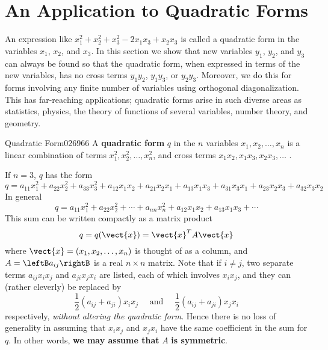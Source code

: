\section{An Application to Quadratic Forms}
\label{sec:8_8}

An expression like $x_{1}^2 + x_{2}^2 + x_{3}^2 - 2x_{1}x_{3} + x_{2}x_{3}$ is called a quadratic form in the variables $x_{1}$, $x_{2}$, and $x_{3}$. In this section we show that new variables $y_{1}$, $y_{2}$, and $y_{3}$ can always be found so that the quadratic form, when expressed in terms of the new variables, has no cross terms $y_{1}y_{2}$, $y_{1}y_{3}$, or $y_{2}y_{3}$. Moreover, we do this for forms involving any finite number of variables using orthogonal diagonalization. This has far-reaching applications; quadratic forms arise in such diverse areas as statistics, physics, the theory of functions of several variables, number theory, and geometry.


\begin{definition}{Quadratic Form}{026966}
A \textbf{quadratic form} $q$ in the $n$ variables $x_1, x_{2}, \dots, x_{n}$ is a linear combination of terms $x_{1}^2, x_{2}^2, \dots, x_{n}^2$, and cross terms $x_{1}x_{2}, x_{1}x_{3}, x_{2}x_{3}, \dots$ .
\end{definition}

If $n = 3$, $q$ has the form
\begin{equation*}
q = a_{11}x_{1}^2 + a_{22}x_{2}^2 + a_{33}x_{3}^2 + a_{12}x_{1}x_{2} + a_{21}x_2x_1+ a_{13}x_{1}x_{3} + a_{31}x_{3}x_{1} + a_{23}x_{2}x_{3} + a_{32}x_{3}x_{2}
\end{equation*}
In general
\begin{equation*}
q = a_{11}x_{1}^2 + a_{22}x_{2}^2 + \cdots + a_{nn}x_{n}^2 + a_{12}x_{1}x_{2} + a_{13}x_{1}x_{3} + \cdots
\end{equation*}
This sum can be written compactly as a matrix product
\begin{equation*}
q = q(\vect{x}) = \vect{x}^TA\vect{x}
\end{equation*}
where $\vect{x} = (x_{1}, x_{2}, \dots, x_{n})$ is thought of as a column, and $A = \leftB a_{ij} \rightB$ is a real $n \times n$ matrix. Note that if $i \neq j$, two separate terms $a_{ij}x_{i}x_{j}$ and $a_{ji}x_{j}x_{i}$ are listed, each of which involves $x_{i}x_{j}$, and they can (rather cleverly) be replaced by
\begin{equation*}
\frac{1}{2}(a_{ij} + a_{ji})x_{i}x_{j} \quad \mbox{ and } \quad \frac{1}{2}(a_{ij} + a_{ji})x_{j}x_{i}
\end{equation*}
respectively, \textit{without altering the quadratic form}. Hence there is no loss of generality in assuming that $x_{i}x_{j}$ and $x_{j}x_{i}$ have the same coefficient in the sum for $q$. In other words, \textbf{we may assume that} $A$ \textbf{is symmetric}.


